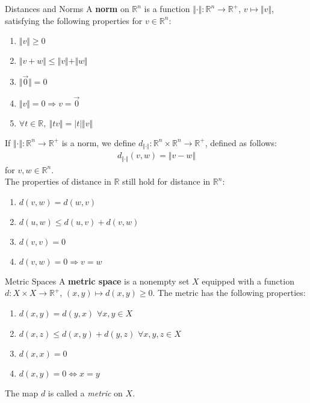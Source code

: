 \documentclass[8pt]{extarticle}
\newcommand{\R}{\mathbb{R}}
\begin{document}
  \begin{problem}{Distances and Norms}
    A \textbf{norm} on $\R^n$ is a function $\Vert \cdot \Vert: \R^n \rightarrow \R^+$, $v\mapsto \Vert v \Vert$, satisfying the following properties for $v\in\R^n$:
    \begin{enumerate}[(1)]
      \item $\Vert v \Vert \geq 0$
      \item $\Vert v + w \Vert \leq \Vert v \Vert + \Vert w \Vert$
      \item $\Vert \vec{0}\Vert = 0$
      \item $\Vert v \Vert = 0\Rightarrow v = \vec{0}$
      \item $\forall t\in\R,~\Vert tv \Vert = |t|\Vert v\Vert$
    \end{enumerate}
    If $\Vert \cdot \Vert: \R^n \rightarrow \R^+$ is a norm, we define $d_{\Vert \cdot \Vert}: \R^n \times \R^n \rightarrow \R^+$, defined as follows:
    \begin{align*}
      d_{\Vert \cdot \Vert}(v,w) = \Vert v-w \Vert
    \end{align*}
    for $v,w\in\R^n$.\\

    The properties of distance in $\R$ still hold for distance in $\R^n$:
    \begin{enumerate}[(1)]
      \item $d(v,w) = d(w,v)$
      \item $d(u,w) \leq d(u,v) + d(v,w)$
      \item $d(v,v) = 0$
      \item $d(v,w) = 0 \Rightarrow v=w$
    \end{enumerate}
  \end{problem}
  \begin{problem}{Metric Spaces}
    A \textbf{metric space} is a nonempty set $X$ equipped with a function $d: X\times X \rightarrow \R^+$, $(x,y)\mapsto d(x,y) \geq 0$. The metric has the following properties:
    \begin{enumerate}[(1)]
      \item $d(x,y) = d(y,x)$ $\forall x,y\in X$
      \item $d(x,z) \leq d(x,y) + d(y,z)$ $\forall x,y,z\in X$
      \item $d(x,x) = 0$
      \item $d(x,y) = 0 \Leftrightarrow x=y$
    \end{enumerate}
    The map $d$ is called a \textit{metric} on $X$.
  \end{problem}
\end{document}
